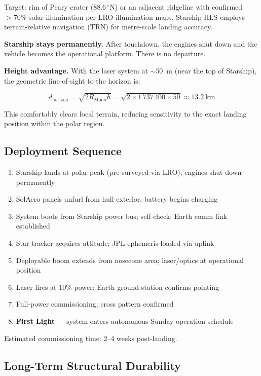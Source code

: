 \documentclass[12pt,letterpaper]{article}
\begin{document}
Target: rim of Peary crater ($88.6\,^\circ$N) or an adjacent ridgeline with
confirmed $>70\%$ solar illumination per LRO illumination maps. Starship HLS
employs terrain-relative navigation (TRN) for metre-scale landing accuracy.

\textbf{Starship stays permanently.} After touchdown, the engines shut down
and the vehicle becomes the operational platform. There is no departure.

\textbf{Height advantage.} With the laser system at $\sim$\SI{50}{\meter}
(near the top of Starship), the geometric line-of-sight to the horizon is:

\[
  d_{\text{horizon}} = \sqrt{2 R_{\text{Moon}} h}
    = \sqrt{2 \times 1\,737\,400 \times 50}
    \approx \SI{13.2}{\kilo\meter}
\]

This comfortably clears local terrain, reducing sensitivity to the exact
landing position within the polar region.

\subsection{Deployment Sequence}

\begin{enumerate}[leftmargin=1.5em]
  \item Starship lands at polar peak (pre-surveyed via LRO); engines shut down permanently
  \item SolAero panels unfurl from hull exterior; battery begins charging
  \item System boots from Starship power bus; self-check; Earth comm link established
  \item Star tracker acquires attitude; JPL ephemeris loaded via uplink
  \item Deployable boom extends from nosecone area; laser/optics at operational position
  \item Laser fires at 10\% power; Earth ground station confirms pointing
  \item Full-power commissioning; cross pattern confirmed
  \item \textbf{First Light} --- system enters autonomous Sunday operation schedule
\end{enumerate}

Estimated commissioning time: 2--4 weeks post-landing.

\subsection{Long-Term Structural Durability}
\end{document}
